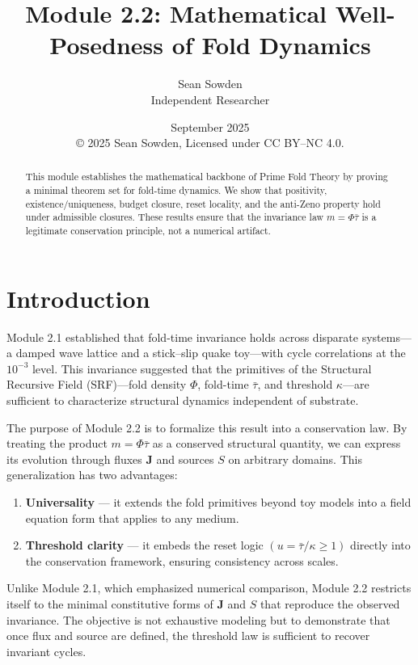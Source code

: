 \documentclass[11pt]{article}
\title{Module 2.2: Mathematical Well-Posedness of Fold Dynamics}
\author{Sean Sowden \\ Independent Researcher}
\date{September 2025 \\[1ex]
© 2025 Sean Sowden, Licensed under CC BY--NC 4.0.}
\begin{document}
\maketitle
\begin{abstract}
This module establishes the mathematical backbone of Prime Fold Theory by 
proving a minimal theorem set for fold-time dynamics. We show that positivity,
existence/uniqueness, budget closure, reset locality, and the anti-Zeno property 
hold under admissible closures. These results ensure that the invariance law 
$m = \Phi \bar{\tau}$ is a legitimate conservation principle, not a numerical artifact.
\end{abstract}

\tableofcontents
\newpage

\section{Introduction}
Module 2.1 established that fold-time invariance holds across disparate systems---a damped wave lattice and a stick--slip quake toy---with cycle correlations at the $10^{-3}$ level. This invariance suggested that the primitives of the Structural Recursive Field (SRF)---fold density $\Phi$, fold-time $\bar{\tau}$, and threshold $\kappa$---are sufficient to characterize structural dynamics independent of substrate.

The purpose of Module 2.2 is to formalize this result into a conservation law. By treating the product $m = \Phi \bar{\tau}$ as a conserved structural quantity, we can express its evolution through fluxes $\mathbf{J}$ and sources $S$ on arbitrary domains. This generalization has two advantages:

\begin{enumerate}
    \item \textbf{Universality} --- it extends the fold primitives beyond toy models into a field equation form that applies to any medium.
    \item \textbf{Threshold clarity} --- it embeds the reset logic $(u = \bar{\tau}/\kappa \geq 1)$ directly into the conservation framework, ensuring consistency across scales.
\end{enumerate}

Unlike Module 2.1, which emphasized numerical comparison, Module 2.2 restricts itself to the minimal constitutive forms of $\mathbf{J}$ and $S$ that reproduce the observed invariance. The objective is not exhaustive modeling but to demonstrate that once flux and source are defined, the threshold law is sufficient to recover invariant cycles.
\end{document}
